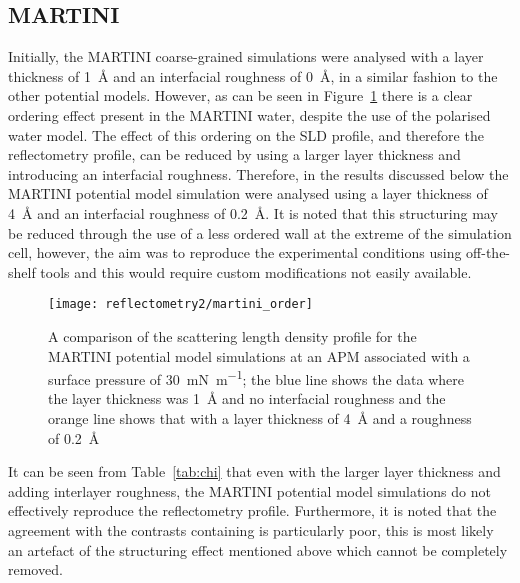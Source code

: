 \subsection{MARTINI}
Initially, the MARTINI coarse-grained simulations were analysed with a layer thickness of \SI{1}{\angstrom} and an interfacial roughness of \SI{0}{\angstrom}, in a similar fashion to the other potential models.
However, as can be seen in Figure~\ref{fig:martorder} there is a clear ordering effect present in the MARTINI water, despite the use of the polarised water model.
The effect of this ordering on the SLD profile, and therefore the reflectometry profile, can be reduced by using a larger layer thickness and introducing an interfacial roughness.
Therefore, in the results discussed below the MARTINI potential model simulation were analysed using a layer thickness of \SI{4}{\angstrom} and an interfacial roughness of \SI{0.2}{\angstrom}.
It is noted that this structuring may be reduced through the use of a less ordered wall \cite{koutsioubas_combined_2016} at the extreme of the simulation cell, however, the aim was to reproduce the experimental conditions using off-the-shelf tools and this would require custom modifications not easily available.
%
\begin{figure}
    \centering
    \texttt{[image: reflectometry2/martini\_order]}
    \caption{A comparison of the scattering length density profile for the MARTINI potential model simulations at an APM associated with a surface pressure of \SI{30}{\milli\newton\per\meter}; the blue line shows the data where the layer thickness was \SI{1}{\angstrom} and no interfacial roughness and the orange line shows that with a layer thickness of \SI{4}{\angstrom} and a roughness of \SI{0.2}{\angstrom}}
    \label{fig:martorder}
\end{figure}
%

It can be seen from Table~\ref{tab:chi} that even with the larger layer thickness and adding interlayer roughness, the MARTINI potential model simulations do not effectively reproduce the reflectometry profile.
Furthermore, it is noted that the agreement with the contrasts containing  is particularly poor, this is most likely an artefact of the structuring effect mentioned above which cannot be completely removed.

